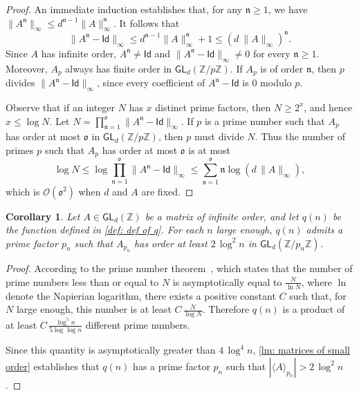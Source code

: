 \documentclass{article}
\def\Id{\textsf{Id}}
\def\O{\mathcal{O}}
\def\Z{\mathbb{Z}}
\def\GL{\textsf{GL}}
\theoremstyle{plain}
\newtheorem{corollary}[theorem]{Corollary}
\theoremstyle{definition}
\begin{document}
\begin{proof}
%
An immediate induction establishes that, for any $\mathfrak{n}\geq 1$, we have
$\|A^\mathfrak{n}\|_\infty \leq d^{\mathfrak{n}-1}\|A\|_\infty^\mathfrak{n}$. It follows that 
\[
\|A^\mathfrak{n}-\Id\|_\infty \leq d^{\mathfrak{n}-1}\|A\|_\infty^\mathfrak{n} + 1 \leq \left(d\ \|A\|_\infty\right)^\mathfrak{n}.
\]
Since $A$ has infinite order, $A^\mathfrak{n}\neq \Id$ and $\|A^\mathfrak{n}-\Id\|_\infty\neq 0$ for every $\mathfrak{n}\ge 1$.
Moreover, $A_p$ always has finite order in $\GL_d(\Z/p\Z)$. If $A_p$ is of order $\mathfrak{n}$, then $p$ divides $\|A^\mathfrak{n}-\Id\|_\infty$, since every coefficient of $A^\mathfrak{n}-\Id$ is $0$ modulo $p$.

Observe that if an integer $N$ has $x$ distinct prime factors, then $N \ge 2^x$, and hence $x \le \log N$. Let $N = \prod_{\mathfrak{n}=1}^\mathfrak{o}\|A^\mathfrak{n}-\Id\|_\infty$. If $p$ is a prime number such that $A_p$ has order at most $\mathfrak{o}$ in $\GL_d(\Z/p\Z)$, then $p$ must divide $N$. Thus the number of primes $p$ such that $A_p$ has order at most $\mathfrak{o}$ is at most
\[
\log N\leq \log \prod_{\mathfrak{n}=1}^\mathfrak{o} \|A^\mathfrak{n}-\Id\|_\infty
\leq \sum_{\mathfrak{n}=1}^\mathfrak{o} \mathfrak{n}\log \left(d\,\|A\|_\infty\right),
\]
which is $\O(\mathfrak{o}^2)$ when $d$ and $A$ are fixed.
%
\end{proof} 

\begin{corollary}\label{lemma: prime divisor of q(n)}
%
Let $A \in \GL_d(\Z)$ be a matrix of infinite order, and let $q(n)$ be the function defined in \cref{def: def of q}. For each $n$ large enough, $q(n)$ admits a prime factor $p_n$ such that $A_{p_n}$ has  order at least $2\,\log^2 n$ in $\GL_d(\Z/p_n\Z)$.
%
\end{corollary}

\begin{proof}
According to the prime number theorem~\cite{hadamard1896distribution,de1896recherches}, which states that the number of prime numbers less than or equal to $N$ is asymptotically equal to $\frac{N}{\ln N}$, where $\ln$ denote the Napierian logarithm, there exists a positive constant $C$ such that, for $N$ large enough, this number is at least $C\, \frac{N}{\log N}$. Therefore $q(n)$ is a product of at least $C\,\frac {\log^5 n}{5\log \log n}$ different prime numbers.

Since this quantity is asymptotically greater than $4\,\log^4n$, \cref{lm: matrices of small order} establishes that $q(n)$ has a prime factor $p_n$ such that $|\langle A\rangle_{p_n}| > 2\,\log^2 n$.
\end{proof}
\end{document}
